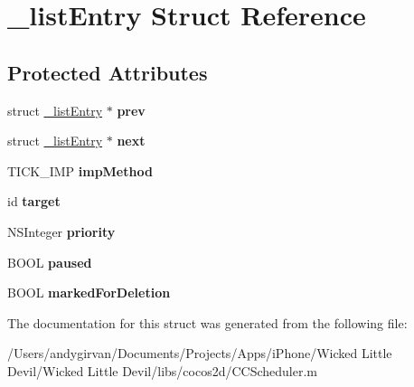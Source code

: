 \hypertarget{struct__list_entry}{\section{\-\_\-list\-Entry Struct Reference}
\label{struct__list_entry}
}
\subsection*{Protected Attributes}
\begin{DoxyCompactItemize}
\item 
\hypertarget{struct__list_entry_a3b2315c239a97de7798badcb0b66203d}{struct \hyperlink{struct__list_entry}{\-\_\-list\-Entry} $\ast$ {\bfseries prev}}\label{struct__list_entry_a3b2315c239a97de7798badcb0b66203d}

\item 
\hypertarget{struct__list_entry_afbaca78f6b0462638a5dd8802dbbb028}{struct \hyperlink{struct__list_entry}{\-\_\-list\-Entry} $\ast$ {\bfseries next}}\label{struct__list_entry_afbaca78f6b0462638a5dd8802dbbb028}

\item 
\hypertarget{struct__list_entry_a447fb6dfadb1c630cc4960eda12312a9}{T\-I\-C\-K\-\_\-\-I\-M\-P {\bfseries imp\-Method}}\label{struct__list_entry_a447fb6dfadb1c630cc4960eda12312a9}

\item 
\hypertarget{struct__list_entry_a105c25c9a8c3734c90f7e358e77c1c09}{id {\bfseries target}}\label{struct__list_entry_a105c25c9a8c3734c90f7e358e77c1c09}

\item 
\hypertarget{struct__list_entry_a9b69678055581f68d25f87d6638308ac}{N\-S\-Integer {\bfseries priority}}\label{struct__list_entry_a9b69678055581f68d25f87d6638308ac}

\item 
\hypertarget{struct__list_entry_ae5b6c4fbe176bd209176b61b7edb58b0}{B\-O\-O\-L {\bfseries paused}}\label{struct__list_entry_ae5b6c4fbe176bd209176b61b7edb58b0}

\item 
\hypertarget{struct__list_entry_a857f00df788f5fcab40fa9a582831d12}{B\-O\-O\-L {\bfseries marked\-For\-Deletion}}\label{struct__list_entry_a857f00df788f5fcab40fa9a582831d12}

\end{DoxyCompactItemize}


The documentation for this struct was generated from the following file\-:\begin{DoxyCompactItemize}
\item 
/\-Users/andygirvan/\-Documents/\-Projects/\-Apps/i\-Phone/\-Wicked Little Devil/\-Wicked Little Devil/libs/cocos2d/C\-C\-Scheduler.\-m\end{DoxyCompactItemize}
